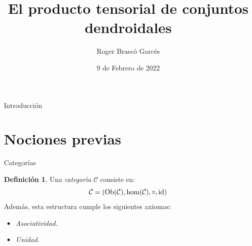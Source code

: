 \documentclass[12pt,aspectratio=169]{beamer}
\title[short title]{El producto tensorial de conjuntos dendroidales} %
\author[Roger Brasco] {Roger Brasc\'o Garc\'es}
\institute[NTU] %
{
    Departamento de Matem\'aticas e Inform\'atica \\
    Universidad de Barcelona %
}
\date{9 de Febrero de 2022} %
\numberwithin{equation}{section}
\theoremstyle{definition}
\newtheorem{defi}[teo]{Definici\'on}
\begin{document}
\begin{frame}
    \titlepage
\end{frame}

\begin{frame}{Introducci\'on}
    \tableofcontents
\end{frame}

\section{Nociones previas}

\begin{frame}{Categor\'ias}
    \begin{defi}
        Una \emph{categor\'{\i}a} $\mathcal{C}$ consiste en:
        $$
            \mathcal{C} = ({\rm Ob}(\mathcal{C}), {\rm hom}(\mathcal{C}), \circ, {\rm id})
        $$
        Adem\'as, esta estructura cumple los siguientes axiomas:
        \begin{itemize}
            \item \emph{Asociatividad}. %
            \item \emph{Unidad}. %
        \end{itemize}
    \end{defi}

\end{frame}
\end{document}
